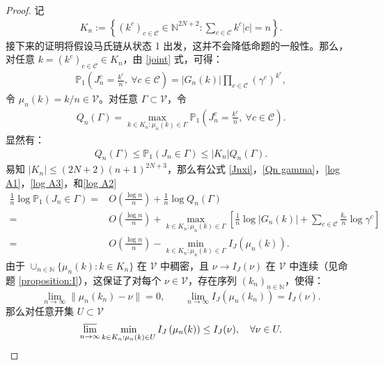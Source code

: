 \begin{proof}
记
\begin{align}\label{set:K_n}
K_n := \left\{(k^c)_{c\in \mathcal{C}}\in \mathbb{N}^{2N+2}: \sum_{c \in \mathcal{C}} k^{c} |c| =n \right\}.
\end{align}
接下来的证明将假设马氏链从状态 1 出发，这并不会降低命题的一般性。那么，对任意 $k=(k^c)_{c\in\mathcal{C}}\in K_n$，由 \eqref{joint} 式，可得：
\begin{align}\label{Jnxi}
\mathbb{P}_1\left(J^c_{n}= \frac{k^c}{n},\ \forall c\in \mathcal{C}\right)
= |G_n(k)| \prod_{c\in\mathcal{C}}\left(\gamma^c\right)^{k^c},
\end{align}
令 $\mu_n(k) = k/n\in\mathcal{V}$。对任意 $\Gamma\subset \mathcal{V}$，令
\begin{align*}
Q_n(\Gamma) = \max_{k\in K_n: \mu_n(k) \in \Gamma}
\mathbb{P}_1\left(J^c_{n} = \frac{k^c}{n},\ \forall c\in\mathcal{C}\right).
\end{align*}
显然有：
\begin{align}\label{Qn gamma}
	Q_n(\Gamma)
	\le \mathbb{P}_1\left(J_{n} \in \Gamma\right)
	\le |K_n| Q_n(\Gamma).
\end{align}
易知 $|K_n| \le (2N+2)(n+1)^{2N+3}$，那么有公式 \eqref{Jnxi}，\eqref{Qn gamma}，\eqref{log A1}，\eqref{log A3}，和\eqref{log A2}
\begin{equation}\label{1 n log P}
	\begin{split}
	\frac{1}{n}\log\mathbb{P}_1\left(J_{n} \in \Gamma\right)=&O\left(\frac{\log n}{n}\right)+\frac{1}{n}\log Q_n(\Gamma)\\
	=&O\left(\frac{\log n}{n}\right)+\max_{k\in K_n: \mu_n(k) \in \Gamma}\left[\frac{1}{n}\log |G_{n}(k)|+\sum_{c \in \mathcal{C}}\frac{k_c}{n}\log \gamma^c\right]\\
	=&O\left(\frac{\log n}{n}\right)-\min_{k\in K_n: \mu_n(k) \in \Gamma}I_J\left(\mu_{n}(k)\right).
	\end{split}
\end{equation}
由于 $\cup_{n\in\mathbb{N}} \{\mu_{n}(k):k\in K_n\}$ 在 $\mathcal{V}$ 中稠密，且 $\nu\to I_J(\nu)$ 在 $\mathcal{V}$ 中连续（见命题 \ref{proposition:I}），这保证了对每个 $\nu\in \mathcal{V}$，存在序列 $(k_n)_{n\in \mathbb{N}}$，使得：
\begin{equation*}
\lim_{n\to\infty} \|\mu_{n}(k_n)-\nu\| = 0, \qquad \lim_{n\to\infty} I_J\left(\mu_{n}(k_n)\right) = I_J(\nu).
\end{equation*}
那么对任意开集 $U\subset \mathcal{V}$
\begin{equation*}
\varlimsup_{n\to\infty}\min_{k\in K_n: \mu_n(k) \in U}I_J\left(\mu_{n}(k)\right)\le I_J(\nu),\quad\forall\nu\in U.

\end{equation*}
\end{proof}
